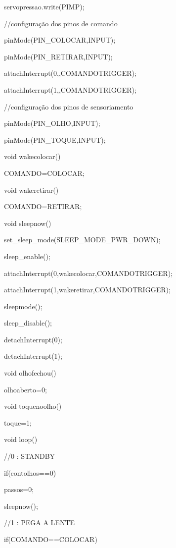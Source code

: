 \begin{apendicesenv}
{    servopressao.write(PIMP);

  
    //configuração dos pinos de comando

    pinMode(PIN\_COLOCAR,INPUT);

    pinMode(PIN\_RETIRAR,INPUT);

    attachInterrupt(0,,COMANDOTRIGGER);

    attachInterrupt(1,,COMANDOTRIGGER);

    
    //configuração dos pinos de sensoriamento

    pinMode(PIN\_OLHO,INPUT);

    pinMode(PIN\_TOQUE,INPUT);

  }
  
  void wakecolocar()

  {

    COMANDO=COLOCAR;

  }

  void wakeretirar()

  {

    COMANDO=RETIRAR;

  }
  
  void sleepnow(){

    set\_sleep\_mode(SLEEP\_MODE\_PWR\_DOWN);

    sleep\_enable();

    attachInterrupt(0,wakecolocar,COMANDOTRIGGER);

    attachInterrupt(1,wakeretirar,COMANDOTRIGGER);

    sleepmode();

    sleep\_disable();

    detachInterrupt(0);

    detachInterrupt(1);

  }
  
  void olhofechou(){

    olhoaberto=0;
  }
  
  void toquenoolho(){

    toque=1;

  }
  
  void loop(){ 
    
   //0 : STANDBY

   if(contolhos==0){

     passos=0;

     sleepnow(); 

   }
   
   //1 : PEGA A LENTE

   if(COMANDO==COLOCAR){

}}
\end{apendicesenv}
